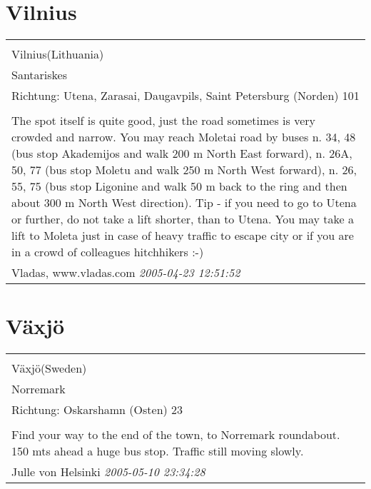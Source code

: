 \documentclass[a4paper,12pt]{article}
\begin{document}
\section{Vilnius}
\begin{tabular}{|p{13cm}|}
\hline\\
Vilnius(Lithuania)\\
Santariskes\\
Richtung: Utena, Zarasai, Daugavpils, Saint Petersburg (Norden) 101 \\
\hline\\
The spot itself is quite good, just the road sometimes is very crowded and narrow.
You may reach Moletai road by buses n. 34, 48 (bus stop Akademijos and walk 200 m North East forward), n. 26A, 50, 77 (bus stop Moletu and walk 250 m North West forward), n. 26, 55, 75 (bus stop Ligonine and walk 50 m back to the ring and then about 300 m North West direction).
Tip - if you need to go to Utena or further, do not take a lift shorter, than to Utena. You may take a lift to Moleta just in case of heavy traffic to escape city or if you are in a crowd of colleagues hitchhikers :-) \\
Vladas, www.vladas.com \textit{ 2005-04-23 12:51:52 }\\\hline
\end{tabular}


\section{Växjö}
\begin{tabular}{|p{13cm}|}
\hline\\
Växjö(Sweden)\\
Norremark\\
Richtung: Oskarshamn (Osten) 23 \\
\hline\\
Find your way to the end of the town, to Norremark roundabout. 150 mts ahead a huge bus stop. Traffic still moving slowly. \\
Julle von Helsinki \textit{ 2005-05-10 23:34:28 }\\\hline
\end{tabular}
\end{document}
